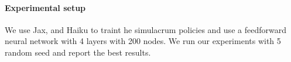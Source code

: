 \paragraph{Experimental setup}
We use Jax, and Haiku to traint he simulacrum policies and use a feedforward neural network with 4 layers with 200 nodes. We run our experiments with 5 random seed and report the best results.
    

